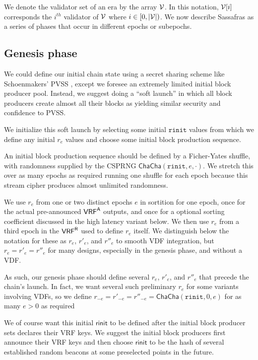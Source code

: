We denote the validator set of an era by the array $ \mathcal{V} $.  In this notation, $ \mathcal{V}[i] $ corresponds the $ i^{th} $ validator of  $ \mathcal{V} $ where $ i \in [0, |\mathcal{V}|) $.   We now describe Sassafras as a series of phases that occur in different epochs or subepochs.

\subsection{Genesis phase}
\label{subsec:genesis_phase}
\newcommand{\rinit}{\mathtt{rinit}} %

We could define our initial chain state using a secret sharing scheme like Schoenmakers' PVSS \cite{Schoenmakers_PVSS}, except we foresee an extremely limited initial block producer pool.  
Instead, we suggest doing a ``soft launch'' in which all block producers create almost all their blocks as yielding similar security and confidence to PVSS. 

We initialize this soft launch by selecting some initial $ \rinit $ values from which we define any initial $r_e$ values and choose some initial block production sequence. 

An initial block production sequence should be defined by a Ficher-Yates shuffle, with randomness supplied by the CSPRNG $\mathsf{ChaCha}(\rinit,e,\cdot)$.  We stretch this over as many epochs as required running one shuffle for each epoch because this stream cipher produces almost unlimited randomness.

We use $r_e$ from one or two distinct epochs $e$ in sortition for one epoch, once for the actual pre-announced $\mathsf{VRF}^{\mathsf{A}}$ outputs, and once for a optional sorting coefficient discussed in the high latency variant below.  We then use $r_e$ from a third epoch in the $\mathsf{VRF}^{\mathsf{R}}$ used to define $r_e$ itself.  We distinguish below the notation for these as $r_e$, $r'_e$, and $r''_e$ to smooth VDF integration, but $r_e = r'_e = r''_e$ for many designs, especially in the genesis phase, and without a VDF.

As such, our genesis phase should define several $r_e$, $r'_e$, and $r''_e$ that precede the chain's launch.  In fact, we want several such preliminary $r_e$ for some variants involving VDFs, so we define $r_{-e} = r'_{-e} = r''_{-e} = \mathsf{ChaCha}(\rinit,0,e)$ for as many $e > 0$ as required

We of course want this initial $\mathsf{rinit}$ to be defined after the initial block producer sets declares their VRF keys.  We suggest the initial block producers first announce their VRF keys and then choose $\mathsf{rinit}$ to be the hash of several established random beacons at some preselected points in the future.


